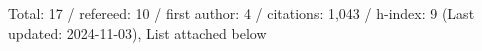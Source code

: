 Total: 17 / refereed: 10 / first author: 4 / citations: 1,043 / h-index: 9 (Last updated: 2024-11-03), List attached below